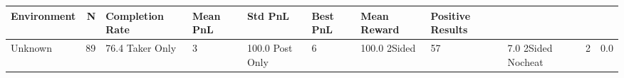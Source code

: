 \begin{tabular}{lrllllll}
\toprule
Environment & N & Completion Rate & Mean PnL & Std PnL & Best PnL & Mean Reward & Positive Results \\
\midrule
Unknown & 89 & 76.4%
Taker Only & 3 & 100.0%
Post Only & 6 & 100.0%
2Sided & 57 & 7.0%
2Sided Nocheat & 2 & 0.0%
\bottomrule
\end{tabular}
